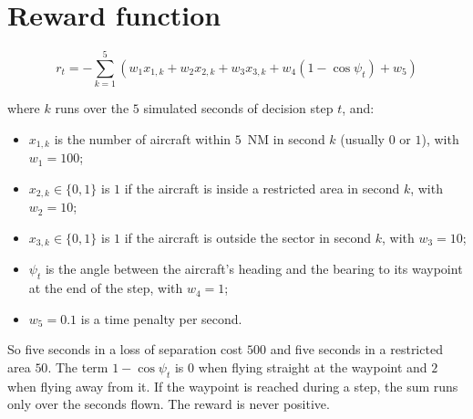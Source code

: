 \documentclass[11pt]{article}
\begin{document}
\section*{Reward function}

\begin{equation}
r_t = -\sum_{k=1}^{5} \left( w_1 x_{1,k} + w_2 x_{2,k} + w_3 x_{3,k} + w_4 \left(1 - \cos \psi_t\right) + w_5 \right)
\end{equation}

\noindent where $k$ runs over the $5$ simulated seconds of decision step $t$, and:
\begin{itemize}
    \item $x_{1,k}$ is the number of aircraft within $5$~NM in second $k$ (usually $0$ or $1$), with $w_1 = 100$;
    \item $x_{2,k} \in \{0,1\}$ is $1$ if the aircraft is inside a restricted area in second $k$, with $w_2 = 10$;
    \item $x_{3,k} \in \{0,1\}$ is $1$ if the aircraft is outside the sector in second $k$, with $w_3 = 10$;
    \item $\psi_t$ is the angle between the aircraft's heading and the bearing to its waypoint at the end of the step, with $w_4 = 1$;
    \item $w_5 = 0.1$ is a time penalty per second.
\end{itemize}

\noindent So five seconds in a loss of separation cost $500$ and five seconds in a restricted area $50$. The term $1 - \cos \psi_t$ is $0$ when flying straight at the waypoint and $2$ when flying away from it. If the waypoint is reached during a step, the sum runs only over the seconds flown. The reward is never positive.
\end{document}
